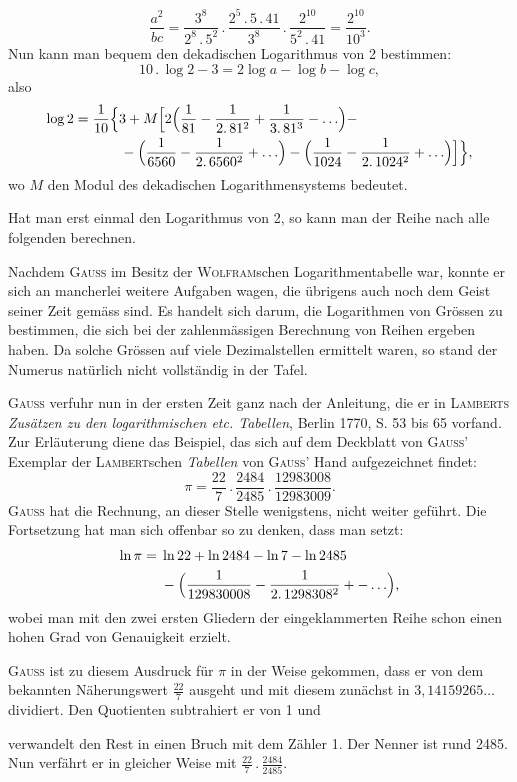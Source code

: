 \[
\frac{a^2}{bc}=\frac{3^8}{2^8\mathpunct{.}5^2}\mathpunct{.}
\frac{2^5\mathpunct{.}5\mathpunct{.}41}{3^8}\mathpunct{.}
\frac{2^{10}}{5^2\mathpunct{.}41}=\frac{2^{10}}{10^3}.
\]
\noindent Nun kann man bequem den dekadischen Logarithmus von 2 bestimmen:
\[
10\mathpunct{.}\log 2-3=2\log a-\log b-\log c,
\]
\noindent also
\[
\begin{aligned}
\log 2={}&\frac{1}{10}\Bigl\{3+M\Bigl[2\Bigl(\frac{1}{81}-\frac{1}{2\mathpunct{.}81^2}+\frac{1}{3\mathpunct{.}81^3}-\ldots\Bigr)-\\
&\qquad-\Bigl(\frac{1}{6560}-\frac{1}{2\mathpunct{.}6560^2}+\ldots\Bigr)
-\Bigl(\frac{1}{1024}-\frac{1}{2\mathpunct{.}1024^2}+\ldots\Bigr)\Bigr]\Bigr\},
\end{aligned}
\]
\noindent wo $M$ den Modul des dekadischen Logarithmensystems bedeutet.

Hat man erst einmal den Logarithmus von 2, so kann man der Reihe
nach alle folgenden berechnen.

Nachdem \textsc{Gauss} im Besitz der \textsc{Wolfram}schen Logarithmentabelle war,
konnte er sich an mancherlei weitere Aufgaben wagen, die übrigens auch
noch dem Geist seiner Zeit gemäss sind. Es handelt sich darum, die Logarithmen von Grössen zu bestimmen, die sich bei der zahlenmässigen Berechnung von Reihen ergeben haben. Da solche Grössen auf viele Dezimalstellen
ermittelt waren, so stand der Numerus natürlich nicht vollständig in der Tafel.

\textsc{Gauss} verfuhr nun in der ersten Zeit ganz nach der Anleitung, die er
in \textsc{Lamberts} \textit{Zusätzen zu den logarithmischen etc. Tabellen}, Berlin 1770, S. 53
bis 65 vorfand. Zur Erläuterung diene das Beispiel, das sich auf dem Deckblatt von \textsc{Gauss}’ Exemplar der \textsc{Lambert}schen \textit{Tabellen} von \textsc{Gauss}’ Hand aufgezeichnet findet:
\[
\pi=\frac{22}{7}\mathpunct{.}\frac{2484}{2485}\mathpunct{.}\frac{12983008}{12983009}.
\]
\noindent \textsc{Gauss} hat die Rechnung, an dieser Stelle wenigstens, nicht weiter geführt.
Die Fortsetzung hat man sich offenbar so zu denken, dass man setzt:
\[
\begin{aligned}
\ln\pi={}&\ln 22+\ln 2484-\ln 7-\ln 2485\\
&-\Bigl(\frac{1}{129830008}-\frac{1}{2\mathpunct{.}1298308^2}+{-}\ldots\Bigr),
\end{aligned}
\]
\noindent wobei man mit den zwei ersten Gliedern der eingeklammerten Reihe schon
einen hohen Grad von Genauigkeit erzielt.

\textsc{Gauss} ist zu diesem Ausdruck für $\pi$ in der Weise gekommen, dass er
von dem bekannten Näherungswert $\frac{22}{7}$ ausgeht und mit diesem zunächst in
$3{,}14159265\ldots$ dividiert. Den Quotienten subtrahiert er von 1 und
\par\clearpage{}
\noindent verwandelt den Rest in einen Bruch mit dem Zähler 1. Der Nenner ist rund
2485. Nun verfährt er in gleicher Weise mit $\frac{22}{7}\mathpunct{.}\frac{2484}{2485}$.
\par\clearpage\endgroup
